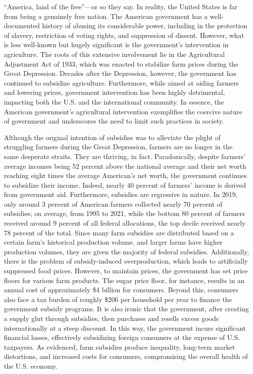 
“America, land of the free”—or so they say. In reality, the United States is far from being a genuinely free nation. The American government has a well-documented history of abusing its considerable power, including in the protection of slavery, restriction of voting rights, and suppression of dissent. However, what is less well-known but hugely significant is the government’s intervention in agriculture. The roots of this extensive involvement lie in the Agricultural Adjustment Act of 1933, which was enacted to stabilize farm prices during the Great Depression. Decades after the Depression, however, the government has continued to subsidize agriculture. Furthermore, while aimed at aiding farmers and lowering prices, government intervention has been highly detrimental, impacting both the U.S. and the international community. In essence, the American government’s agricultural intervention exemplifies the coercive nature of government and underscores the need to limit such practices in society.  

Although the original intention of subsidies was to alleviate the plight of struggling farmers during the Great Depression, farmers are no longer in the same desperate straits. They are thriving, in fact. Paradoxically, despite farmers’ average incomes being 52 percent above the national average and their net worth reaching eight times the average American’s net worth, the government continues to subsidize their income. Indeed, nearly 40 percent of farmers’ income is derived from government aid. Furthermore, subsidies are regressive in nature. In 2019, only around 3 percent of American farmers collected nearly 70 percent of subsidies; on average, from 1995 to 2021, while the bottom 80 percent of farmers received around 9 percent of all federal allocations, the top decile received nearly 78 percent of the total. Since many farm subsidies are distributed based on a certain farm’s historical production volume, and larger farms have higher production volumes, they are given the majority of federal subsidies. Additionally, there is the problem of subsidy-induced overproduction, which leads to artificially suppressed food prices. However, to maintain prices, the government has set price floors for various farm products. The sugar price floor, for instance, results in an annual cost of approximately \$4 billion for consumers. Beyond this, consumers also face a tax burden of roughly \$206 per household per year to finance the government subsidy programs. It is also ironic that the government, after creating a supply glut through subsidies, then purchases and resells excess goods internationally at a steep discount. In this way, the government incurs significant financial losses, effectively subsidizing foreign consumers at the expense of U.S. taxpayers. As evidenced, farm subsidies produce inequality, long-term market distortions, and increased costs for consumers, compromising the overall health of the U.S. economy. 

